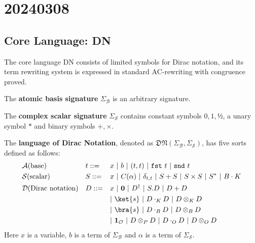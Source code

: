 \chapter{20240308}

\renewcommand*{\unit}{\texttt{unit}}
\renewcommand*{\utt}{\texttt{tt}}
\renewcommand*{\fst}{\texttt{fst}}
\renewcommand*{\snd}{\texttt{snd}}
\renewcommand*{\reduce}{\ \triangleright\ }
\renewcommand*{\reducefrom}{\ \triangleleft\ }

\renewcommand*{\zeroK}[1]{\mathbf{0}_{\mathcal{K}(#1)}}
\renewcommand*{\zeroB}[1]{\mathbf{0}_{\mathcal{B}(#1)}}
\renewcommand*{\zeroO}[1]{\mathbf{0}_{\mathcal{O}(#1)}}


\section{Core Language: DN}

The core language DN consists of limited symbols for Dirac notation, and its term rewriting system is expressed in standard AC-rewriting with congruence proved.

\begin{definition} 
  The \textbf{atomic basis signature} $\Sigma_\mathcal{B}$ is an arbitrary signature.
\end{definition}

\begin{definition} 
  The \textbf{complex scalar signature} $\Sigma_\mathcal{S}$ contains constant symbols $0, 1, \text{½}$, a unary symbol $*$ and binary symbols $+, \times$.
\end{definition}

\begin{definition}
  The \textbf{language of Dirac Notation}, denoted as $\mathfrak{DN}(\Sigma_\mathcal{B}, \Sigma_\mathcal{S})$, has five sorts defined as follows:
  \begin{align*}
    & \mathcal{A} \textrm{(base)} && t ::= && x\ |\ b\ |\ (t, t)\ |\ \fst\ t\ |\ \snd\ t \\
    & \mathcal{S} \textrm{(scalar)} && S ::= && x\ |\ C(\alpha)\ |\ \delta_{t, t}\ |\ S + S\ |\ S \times S\ |\ S^*\ |\ B \cdot K \\
    & \mathcal{D} \textrm{(Dirac notation)} && D ::= && x\ |\ \mathbf{0}\ |\ D^\dagger\ |\ S.D\ |\ D + D \\
    & && && |\ \ket{s}\ |\ D \cdot_{K} D\ |\ D \otimes_{K} D \\
    & && && |\ \bra{s}\ |\ D \cdot_{B} D\ |\ D \otimes_{B} D \\
    & && && |\ \mathbf{1}_\mathcal{O}\ |\ D \otimes_P D\ |\ D \cdot_{O} D\ |\ D \otimes_{O} D
  \end{align*}
  Here $x$ is a variable, $b$ is a term of $\Sigma_\mathcal{B}$ and $\alpha$ is a term of $\Sigma_\mathcal{S}$.

\end{definition}

